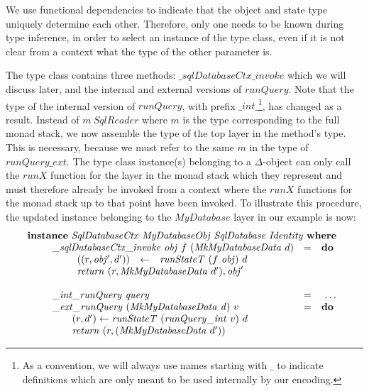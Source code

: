 We use functional dependencies\cite{jones2000type} to indicate that the object and state type uniquely determine each other. Therefore, only one needs to be known during type inference, in order to select an instance of the type class, even if it is not clear from a context what the type of the other parameter is.

The type class contains three methods: $\mathit{\_sqlDatabaseCtx\_invoke}$ which we will discuss later, and the internal and external versions of $\mathit{runQuery}$. Note that the type of the internal version of $\mathit{runQuery}$, with prefix $\_\mathit{int}\_$\footnote{As a convention, we will always use names starting with $\_$ to indicate definitions which are only meant to be used internally by our encoding.}, has changed as a result. Instead of $m~\mathit{SqlReader}$ where $m$ is the type corresponding to the full monad stack, we now assemble the type of the top layer in the method's type. This is necessary, because we must refer to the same $m$ in the type of $\mathit{runQuery\_ext}$. The type class instance(s) belonging to a $\Delta$-object can only call the $\mathit{runX}$ function for the layer in the monad stack which they represent and must therefore already be invoked from a context where the $\mathit{runX}$ functions for the monad stack up to that point have been invoked. To illustrate this procedure, the updated instance belonging to the $\mathit{MyDatabase}$ layer in our example is now:
\begin{displaymath}
\begin{array}{l}
\mathbf{instance}~\mathit{SqlDatabaseCtx}~\mathit{MyDatabaseObj}~\mathit{SqlDatabase}~\mathit{Identity}~\mathbf{where}\\
\qquad \begin{array}{lcl}
\mathit{\_\mathit{sqlDatabaseCtx\_invoke}}~\mathit{obj}~f~(\mathit{MkMyDatabaseData}~d) & = & \mathbf{do}\\
\multicolumn{3}{l}{\qquad \begin{array}{lcl}
((r, \mathit{obj'}, d')) & \leftarrow & \mathit{runStateT}~(f~\mathit{obj})~d \\
\multicolumn{3}{l}{\mathit{return}~(r, \mathit{MkMyDatabaseData}~d'), \mathit{obj}'}
\end{array}}
\\\\
\mathit{\_int\_runQuery}~\mathit{query} & = & ~\ldots \\
\mathit{\_ext\_runQuery}~(\mathit{MkMyDatabaseData}~\mathit{d})~v & = & \mathbf{do} \\
\multicolumn{3}{l}{\qquad (r,d') \leftarrow \mathit{runStateT}~(\mathit{runQuery\_int}~v)~d } \\ 
\multicolumn{3}{l}{\qquad \mathit{return}~(r, (\mathit{MkMyDatabaseData}~d')) } 
\end{array}
\end{array}
\end{displaymath}
